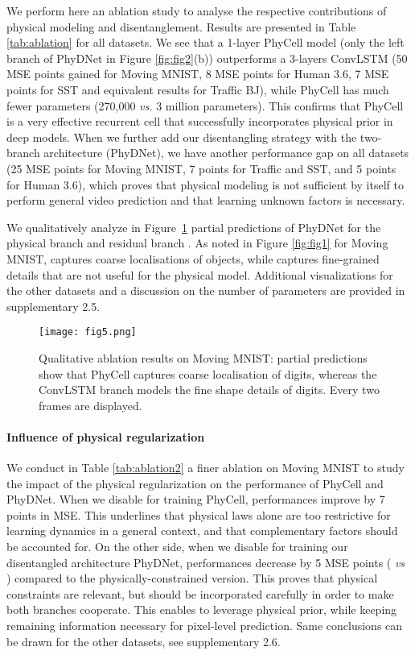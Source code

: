 \documentclass[10pt,twocolumn,letterpaper]{article}
\begin{document}
We perform here an ablation study to analyse the respective contributions of physical modeling and disentanglement. Results are presented in Table \ref{tab:ablation} for all datasets. We see that a 1-layer PhyCell model (only the left branch of PhyDNet in Figure \ref{fig:fig2}(b)) outperforms a 3-layers ConvLSTM (50 MSE points gained for Moving MNIST, 8 MSE points for Human 3.6, 7 MSE points for SST and equivalent results for Traffic BJ), while PhyCell  has much fewer parameters (270,000 \textit{vs.} 3 million parameters). This confirms that PhyCell is a very effective recurrent cell that successfully incorporates physical prior in deep models.  When we further add our disentangling strategy with the two-branch architecture (PhyDNet), we have another performance gap on all datasets (25 MSE points for Moving MNIST, 7 points for Traffic and SST, and 5 points for Human 3.6), which proves that physical modeling is not sufficient by itself to perform general video prediction and that learning unknown factors is necessary.

We qualitatively analyze in Figure~\ref{fig:ablation} partial predictions of PhyDNet for the physical branch   and residual branch  . As noted in Figure \ref{fig:fig1} for Moving MNIST,  captures coarse localisations of objects, while  captures fine-grained details that are not useful for the physical model. Additional visualizations for the other datasets and a discussion on the number of parameters are provided in supplementary 2.5.

\begin{figure}
    \centering
\texttt{[image: fig5.png]}
    \caption{Qualitative ablation results on Moving MNIST: partial predictions show that PhyCell captures coarse localisation of digits, whereas the ConvLSTM branch models the fine shape details of digits. Every two frames are displayed.}
    \label{fig:ablation}
\end{figure}

\paragraph{Influence of physical regularization}

We conduct in Table \ref{tab:ablation2} a finer ablation on Moving MNIST to study the impact of the physical regularization  on the performance of PhyCell and PhyDNet. When we disable  for training PhyCell, performances improve by 7 points in MSE. This underlines that physical laws alone are too restrictive for learning dynamics in a general context, and that complementary factors should be accounted for.  
On the other side, when we disable  for training our disentangled architecture PhyDNet, performances decrease by 5 MSE points ( \textit{vs} ) compared to the physically-constrained version. This proves that physical constraints are relevant, but should be incorporated carefully in order to make both branches cooperate. This enables to leverage physical prior, while keeping remaining information necessary for pixel-level prediction. Same conclusions can be drawn for the other datasets, see supplementary 2.6.
\end{document}
